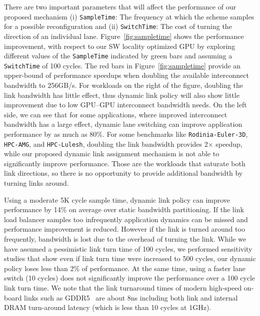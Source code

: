 There are two important parameters that will affect the performance of
our proposed mechanism (i)
\texttt{SampleTime}: The frequency at which the scheme samples for a possible
reconfiguration and (ii) \texttt{SwitchTime}: The cost of turning the
direction of an individual lane. Figure~\ref{fig:sampletime} shows the 
performance improvement, with
respect to our SW locality optimized GPU by exploring different values of the
\texttt{SampleTime} indicated by green bars and assuming a \texttt{SwitchTime}
of 100 cycles. The red bars in Figure~\ref{fig:sampletime} provide an
upper-bound of performance speedups when doubling the available interconnect
bandwidth to 256GB/s. For workloads on the right of the figure, doubling the link
bandwidth has little effect, thus dynamic link policy will also show little
improvement due to low GPU--GPU interconnect bandwidth needs.
On the left side, we can see that for some
applications, where improved interconnect bandwidth has a large effect,
dynamic lane switching can improve application performance by as much as 80\%.
For some benchmarks like \texttt{Rodinia-Euler-3D}, \texttt{HPC-AMG}, and 
\texttt{HPC-Lulesh}, doubling the link bandwidth provides 2$\times$ 
speedup, while our proposed dynamic link assignment mechanism is not 
able to significantly improve performance. Those are the workloads 
that saturate both link directions, so there is no opportunity to 
provide additional bandwidth by turning links around.

Using a moderate 5K cycle sample time, dynamic link policy can improve performance
by 14\% on average over static bandwidth partitioning. If the link load
balancer samples too infrequently application dynamics can be missed
and performance improvement is reduced. However if the link is turned around
too frequently, bandwidth is lost due to the overhead of turning the link.
While we have assumed a pessimistic link turn time of 100 cycles, we performed
sensitivity studies that show even if link turn time were increased to 500
cycles, our dynamic policy loses less than 2\% of performance. 
At the same time, using a faster lane switch (10 cycles) does not
significantly improve the performance over a 100 cycle link turn time.
We note that the link
turnaround times of modern high-speed on-board links such as
GDDR5~\cite{hynixgddr51Gb} are about 8ns including both link and internal 
DRAM turn-around latency (which is less than 10 cycles at 1GHz).

